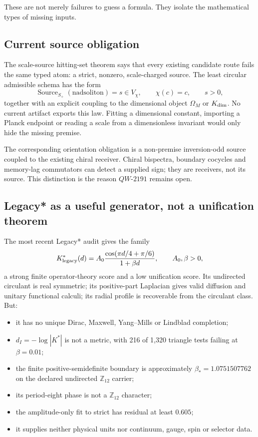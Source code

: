 \documentclass[11pt,a4paper]{article}
\theoremstyle{definition}
\theoremstyle{remark}
\newcommand{\Z}{\mathbb Z}
\begin{document}
These are not merely failures to guess a formula. They isolate the mathematical types of missing inputs.

\subsection{Current source obligation}

The scale-source hitting-set theorem says that every existing candidate route fails the same typed atom: a strict, nonzero, scale-charged source. The least circular admissible schema has the form
\[
\operatorname{Source}_{S_+}(\text{nadsoliton})=s\in V_\chi,
\qquad \chi(c)=c,
\qquad s>0,
\]
together with an explicit coupling to the dimensional object $\Omega_M$ or $K_{\rm dim}$. No current artifact exports this law. Fitting a dimensional constant, importing a Planck endpoint or reading a scale from a dimensionless invariant would only hide the missing premise.

The corresponding orientation obligation is a non-premise inversion-odd source coupled to the existing chiral receiver. Chiral bispectra, boundary cocycles and memory-lag commutators can detect a supplied sign; they are receivers, not its source. This distinction is the reason $QW\text{-}2191$ remains open.

\subsection{Legacy* as a useful generator, not a unification theorem}

The most recent Legacy* audit gives the family
\[
K^*_{\rm legacy}(d)=A_0\frac{\cos(\pi d/4+\pi/6)}{1+\beta d},
\qquad A_0,\beta>0,
\]
a strong finite operator-theory score and a low unification score. Its undirected circulant is real symmetric; its positive-part Laplacian gives valid diffusion and unitary functional calculi; its radial profile is recoverable from the circulant class. But:

\begin{itemize}
\item it has no unique Dirac, Maxwell, Yang--Mills or Lindblad completion;
\item $d_I=-\log|K^*|$ is not a metric, with 216 of 1,320 triangle tests failing at $\beta=0.01$;
\item the finite positive-semidefinite boundary is approximately $\beta_*=1.0751507762$ on the declared undirected $\Z_{12}$ carrier;
\item its period-eight phase is not a $\Z_{12}$ character;
\item the amplitude-only fit to strict has residual at least $0.605$;
\item it supplies neither physical units nor continuum, gauge, spin or selector data.
\end{itemize}
\end{document}
